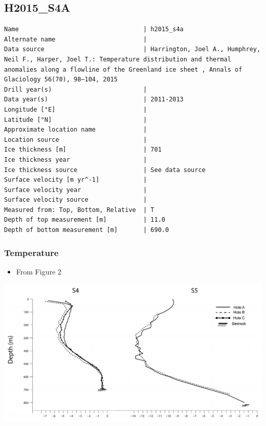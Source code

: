 \documentclass[article,a4paper,times,11pt,twoside]{article}
\begin{document}
\subsection{H2015\_S4A}
\label{sec:org040518b}
\begin{verbatim}
Name                                  | h2015_s4a
Alternate name                        | 
Data source                           | Harrington, Joel A., Humphrey, Neil F., Harper, Joel T.: Temperature distribution and thermal anomalies along a flowline of the Greenland ice sheet , Annals of Glaciology 56(70), 98–104, 2015 
Drill year(s)                         | 
Data year(s)                          | 2011-2013
Longitude [°E]                        | 
Latitude [°N]                         | 
Approximate location name             | 
Location source                       | 
Ice thickness [m]                     | 701
Ice thickness year                    | 
Ice thickness source                  | See data source
Surface velocity [m yr^-1]            | 
Surface velocity year                 | 
Surface velocity source               | 
Measured from: Top, Bottom, Relative  | T
Depth of top measurement [m]          | 11.0
Depth of bottom measurement [m]       | 690.0
\end{verbatim}

\subsubsection{Temperature}
\label{sec:org56e4c32}

\begin{itemize}
\item From \textcite{harrington_2015} Figure 2
\end{itemize}

\begin{center}
\includegraphics[width=.9\linewidth]{h2015_s4a/harrington_2015_fig2_S4_S5.png}
\end{center}
\end{document}
